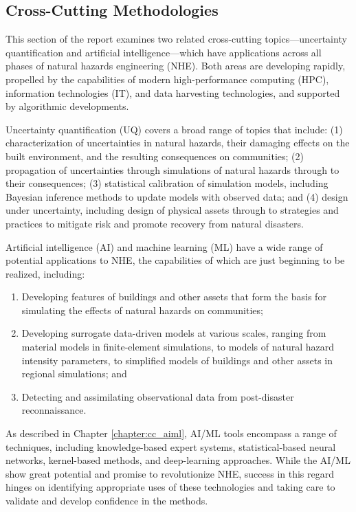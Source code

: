 
\begin{partbacktext}
\part{Cross-Cutting Methodologies}
\label{part:cross}

This section of the report examines two related cross-cutting topics---uncertainty quantification and artificial intelligence---which have applications across all phases of natural hazards engineering (NHE).  Both areas are developing rapidly, propelled by the capabilities of modern high-performance computing (HPC), information technologies (IT), and data harvesting technologies, and supported by algorithmic developments.  

Uncertainty quantification (UQ) covers a broad range of topics that include: (1) characterization of uncertainties in natural hazards, their damaging effects on the built environment, and the resulting consequences on communities; (2) propagation of uncertainties through simulations of natural hazards through to their consequences; (3) statistical calibration of simulation models, including Bayesian inference methods to update models with observed data; and (4) design under uncertainty, including design of physical assets through to strategies and practices to mitigate risk and promote recovery from natural disasters.  

Artificial intelligence (AI) and machine learning (ML) have a wide range of potential applications to NHE, the capabilities of which are just beginning to be realized, including:

\begin{enumerate}
    \item Developing features of buildings and other assets that form the basis for simulating the effects of natural hazards on communities;
    \vspace{2mm}
    \item Developing surrogate data-driven models at various scales, ranging from material models in finite-element simulations, to models of natural hazard intensity parameters, to simplified models of buildings and other assets in regional simulations; and
    \vspace{2mm}
    \item Detecting and assimilating observational data from post-disaster reconnaissance.
\end{enumerate}

As described in Chapter \ref{chapter:cc_aiml}, AI/ML tools encompass a range of techniques, including knowledge-based expert systems, statistical-based neural networks, kernel-based methods, and deep-learning approaches.
While the AI/ML show great potential and promise to revolutionize NHE, success in this regard hinges on identifying appropriate uses of these technologies and taking care to validate and develop confidence in the methods.


\end{partbacktext}